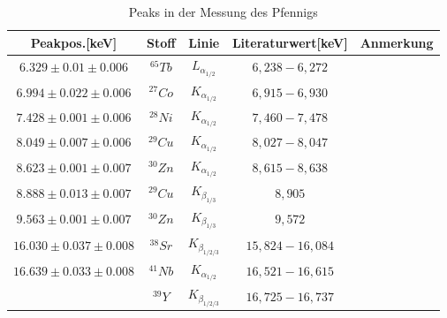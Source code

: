 \documentclass[12pt,a4paper]{article}
\begin{document}
\begin{table}[H]
\center
\begin{tabular}{|c|c|c|c|c|}
\hline 
Peakpos.[keV] & Stoff & Linie & Literaturwert[keV] & Anmerkung \\
\hline 
$6.329 \pm 0.01 \pm 0.006$& $^{65}Tb$ & $L_{\alpha_{1/2}}$ & $6,238-6,272$ & \\
\hline 
$6.994 \pm 0.022 \pm 0.006$ & $^{27}Co$ & $K_{\alpha_{1/2}}$ & $6,915-6,930$ & \\ 
\hline 
$7.428 \pm 0.001 \pm 0.006$ & $^{28}Ni$ & $K_{\alpha_{1/2}}$ & $7,460-7,478$ & \\
\hline
$8.049 \pm 0.007 \pm 0.006$ & $^{29}Cu$ & $K_{\alpha_{1/2}}$ & $8,027-8,047$ & \\
\hline
$8.623 \pm 0.001 \pm 0.007$ & $^{30}Zn$ & $K_{\alpha_{1/2}}$ & $8,615-8,638$ & \\
\hline
$8.888 \pm 0.013 \pm 0.007$ & $^{29}Cu$ & $K_{\beta_{1/3}}$ & $8,905$ & \\
\hline
$9.563 \pm 0.001 \pm 0.007$ & $^{30}Zn$ & $K_{\beta_{1/3}}$ & $9,572$ & \\
\hline
$16.030 \pm 0.037 \pm 0.008$ & $^{38}Sr$ & $K_{\beta_{1/2/3}}$ & $15,824-16,084$ & \\
\hline
$16.639 \pm 0.033 \pm 0.008$ & $^{41}Nb$ & $K_{\alpha_{1/2}}$ & $16,521-16,615$ & \\
& $^{39}Y$ & $K_{\beta_{1/2/3}}$ & $16,725-16,737$ & \\
\hline
\end{tabular} 
\caption{Peaks in der Messung des Pfennigs}
\label{a_peaks_leer}
\end{table}

\newpage
\end{document}
